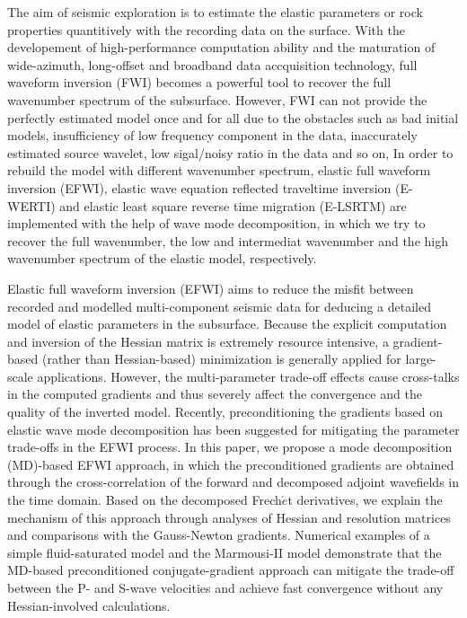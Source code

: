 
\begin{eabstract}
	The aim of seismic exploration is to estimate the elastic parameters or rock properties
	quantitively                                              
	with the recording data on the surface. With the developement of 
	high-performance computation ability and the
	maturation of wide-azimuth, long-offset and broadband data accquisition 
	technology, full waveform inversion (FWI) becomes a powerful tool to recover the full
	 wavenumber spectrum of the subsurface. However, FWI can not provide the perfectly estimated
	model
	once and for all due to the obstacles such as bad initial models,
	insufficiency of low frequency component in the data, inaccurately estimated source
	wavelet, low sigal/noisy ratio in the data and so on,
	In order to rebuild the model with different wavenumber spectrum, elastic full waveform
	inversion (EFWI), elastic wave equation 
	reflected traveltime inversion (E-WERTI) and elastic least square reverse time
	migration (E-LSRTM) are implemented with the help of wave mode decomposition, in which we
	try to recover the full wavenumber, the low and intermediat wavenumber
	and the high wavenumber spectrum of the elastic model, respectively.

Elastic full waveform inversion (EFWI) aims to reduce the misfit between recorded and modelled multi-component
seismic data for deducing a detailed model of elastic parameters in the subsurface.
Because the explicit computation and inversion of the Hessian matrix
is extremely resource intensive,
a gradient-based (rather than Hessian-based) minimization is generally applied for large-scale applications.
However, the multi-parameter trade-off effects cause cross-talks in the computed gradients and
thus severely affect the convergence and the quality of the inverted model.
Recently, preconditioning the gradients based on elastic wave mode decomposition
has been suggested for mitigating the parameter trade-offs in the EFWI process.
In this paper, we propose a mode decomposition (MD)-based EFWI approach, in which the preconditioned gradients
are obtained through the cross-correlation of the forward and
decomposed adjoint wavefields in the time domain.
Based on the decomposed Frech{$\acute{e}$}t derivatives,
we explain the mechanism of this approach through analyses of Hessian and resolution matrices
and comparisons with the Gauss-Newton gradients.
Numerical examples of a simple fluid-saturated model and the Marmousi-II model
demonstrate that the MD-based preconditioned conjugate-gradient approach
can mitigate the trade-off between the P- and S-wave velocities and achieve fast
convergence without any Hessian-involved calculations.


\end{eabstract}
